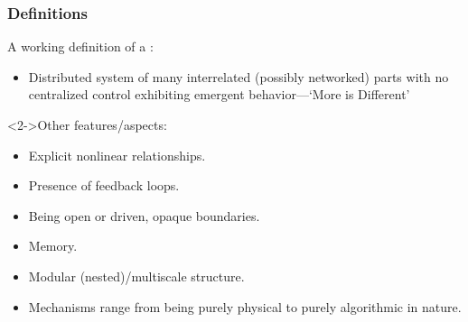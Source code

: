 \begin{frame}
  \frametitle{Definitions}


  \begin{block}{A working definition of a :}
    \begin{itemize}
    \item<1->
      Distributed system of many interrelated (possibly networked) parts
      with no centralized control
      exhibiting 
      emergent behavior---`More is Different'\cite{anderson1972a}
    \end{itemize}    
  \end{block}

  \begin{block}<2->{Other features/aspects:}
    \begin{itemize}
    \item<+->
      Explicit nonlinear relationships.
    \item<+->
      Presence of feedback loops.
    \item<+->
      Being open or driven, opaque boundaries.
    \item<+->
      Memory.
    \item<+->
      Modular (nested)/multiscale structure.
    \item<+->
      Mechanisms range from being purely physical to purely algorithmic in nature.
    \end{itemize}
  \end{block}

\end{frame}


